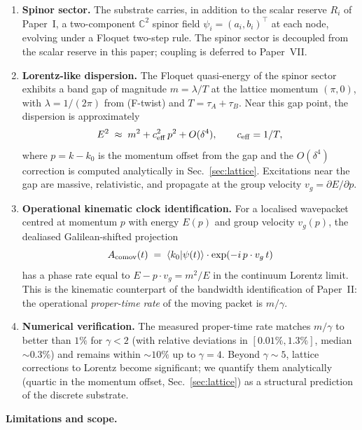 \documentclass[11pt,a4paper]{article}
\begin{document}
\begin{enumerate}
\item \textbf{Spinor sector.} The substrate carries, in addition
to the scalar reserve $R_i$ of Paper~I, a two-component
$\mathbb{C}^2$ spinor field $\psi_i = (a_i, b_i)^\top$ at each
node, evolving under a Floquet two-step rule. The spinor sector
is decoupled from the scalar reserve in this paper; coupling is
deferred to Paper~VII.

\item \textbf{Lorentz-like dispersion.} The Floquet quasi-energy
of the spinor sector exhibits a band gap of magnitude
$m = \lambda/T$ at the lattice momentum $(\pi, 0)$, with
$\lambda = 1/(2\pi)$ from (F-twist) and $T = \tau_A + \tau_B$.
Near this gap point, the dispersion is approximately
\begin{equation}
E^2 \;\approx\; m^2 + c_{\rm eff}^2\, p^2 + O(\delta^4),
\qquad c_{\rm eff} = 1/T,
\label{eq:lorentz_dispersion_claim}
\end{equation}
where $p = k - k_0$ is the momentum offset from the gap and the
$O(\delta^4)$ correction is computed analytically in
Sec.~\ref{sec:lattice}. Excitations near the gap are massive,
relativistic, and propagate at the group velocity
$v_g = \partial E/\partial p$.

\item \textbf{Operational kinematic clock identification.} For a
localised wavepacket centred at momentum $p$ with energy $E(p)$
and group velocity $v_g(p)$, the dealiased Galilean-shifted
projection
\[
A_{\rm comov}(t) \;=\; \langle k_0 | \psi(t) \rangle
\cdot \exp(-i\,p \cdot v_g\, t)
\]
has a phase rate equal to $E - p \cdot v_g = m^2/E$ in the
continuum Lorentz limit. This is the kinematic counterpart of
the bandwidth identification of Paper~II: the operational
\emph{proper-time rate} of the moving packet is $m/\gamma$.

\item \textbf{Numerical verification.} The measured proper-time
rate matches $m/\gamma$ to better than $1\%$ for $\gamma < 2$
(with relative deviations in $[0.01\%, 1.3\%]$, median
$\sim 0.3\%$) and remains within $\sim 10\%$ up to $\gamma = 4$.
Beyond $\gamma \sim 5$, lattice corrections to Lorentz become
significant; we quantify them analytically (quartic in the
momentum offset, Sec.~\ref{sec:lattice}) as a structural
prediction of the discrete substrate.
\end{enumerate}

\textbf{Limitations and scope.}
\end{document}
